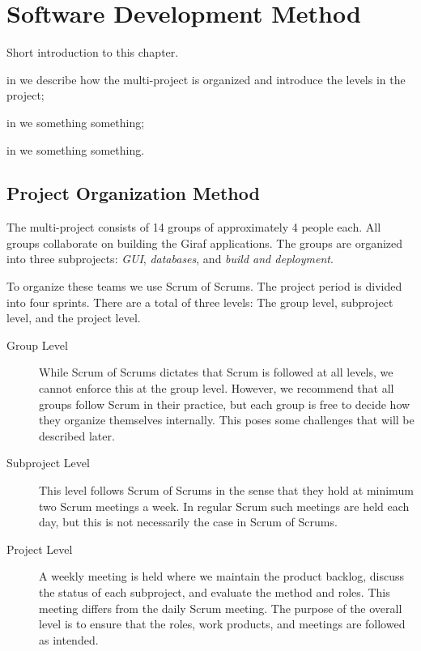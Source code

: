 \chapter{Software Development Method}%
Short introduction to this chapter. \dummy~\dummy~\dummy~\dummy~\dummy~\dummy

\begin{chapterorganization}
  \item in  we describe how the multi-project is organized and introduce the levels in the project;
  \item in  we something something;
  \item in  we something something.
\end{chapterorganization}

\section{Project Organization Method}\label{sec:project_overview}
The multi-project consists of 14 groups of approximately 4 people each. All groups collaborate on building the Giraf applications. The groups are organized into three subprojects: \emph{GUI}, \emph{databases}, and \emph{build and deployment}.

To organize these teams we use Scrum of Scrums. The project period is divided into four sprints. There are a total of three levels: The group level, subproject level, and the project level.

\begin{description}
	\item[Group Level] While Scrum of Scrums dictates that Scrum is followed at all levels, we cannot enforce this at the group level. However, we recommend that all groups follow Scrum in their practice, but each group is free to decide how they organize themselves internally. This poses some challenges that will be described later.
	\item[Subproject Level] This level follows Scrum of Scrums in the sense that they hold at minimum two Scrum meetings a week. In regular Scrum such meetings are held each day, but this is not necessarily the case in Scrum of Scrums.
	\item[Project Level] A weekly meeting is held where we maintain the product backlog, discuss the status of each subproject, and evaluate the method and roles. This meeting differs from the daily Scrum meeting. The purpose of the overall level is to ensure that the roles, work products, and meetings are followed as intended.
\end{description}

